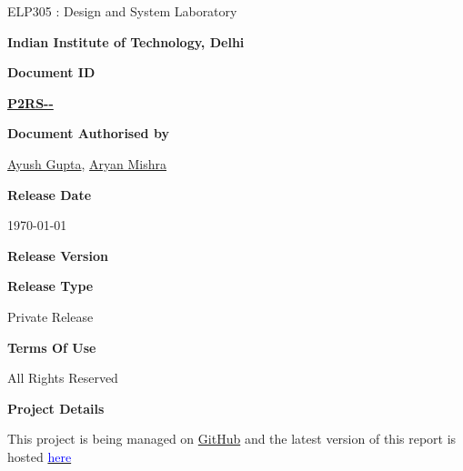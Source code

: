 \begin{titlepage}
{				\par
            }
            \vskip0.1in
             {
				\fontsize{16}{16}
				\sffamily
                ELP305 : Design and System Laboratory
				\par
            }
            \vskip0.1in
             {
				\fontsize{16}{14}
				\sffamily
                \textbf{Indian Institute of Technology, Delhi}
                \par
            }
    \vspace{0.85in}
    {
        \normalsize
        \sffamily
        \textbf{\textcolor{tuberlindarkgray}{Document ID}}\par \vspace{0.12cm}
                \hyperlink{Target_DocInfo}{\textbf{P2RS-\mydate-}}\par
                \vspace{0.24cm}  
        \textbf{\textcolor{tuberlindarkgray}{Document Authorised by}}\par \vspace{0.12cm}
        {\href{https://www.linkedin.com/in/ayush-gupta-undergraduate/}{Ayush Gupta}, \href{http://linkedin.com/in/aryan-mishra-04j}{Aryan Mishra}}

        \vspace{0.24cm}
        \textbf{\textcolor{tuberlindarkgray}{Release Date}}\par \vspace{0.12cm}
        {\today}

        \vspace{0.24cm}
        \textbf{\textcolor{tuberlindarkgray}{Release Version}}\par \vspace{0.12cm}
        \textbf{\hyperlink{Target_DocInfo}{}}\par
    \vspace{0.24cm}
        
        \textbf{\textcolor{tuberlindarkgray}{Release Type}}\par \vspace{0.12cm}
        {Private Release}

        \vspace{0.24cm}
        \textbf{\textcolor{tuberlindarkgray}{Terms Of Use}}\par \vspace{0.12cm}
        {All Rights Reserved}

        \vspace{0.24cm}
        \textbf{\textcolor{tuberlindarkgray}{Project Details}}\par \vspace{0.12cm}
        {This project is being managed on \href{https://github.com/ELP305-Cleaning-Machine}{GitHub} and the latest version of this report is hosted \href{https://2nav.github.io/TribeC/}{\textcolor{blue}{here}}}
    }
\end{titlepage}
\afterpage{\restoregeometry}